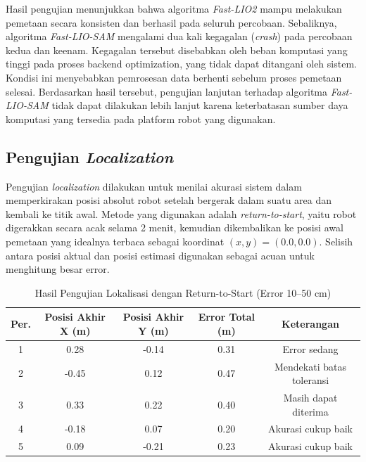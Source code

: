 Hasil pengujian menunjukkan bahwa algoritma \emph{Fast-LIO2} mampu melakukan
pemetaan secara konsisten dan berhasil pada seluruh percobaan. Sebaliknya,
algoritma \emph{Fast-LIO-SAM} mengalami dua kali kegagalan (\emph{crash}) pada
percobaan kedua dan keenam. Kegagalan tersebut disebabkan oleh beban komputasi yang
tinggi pada proses backend optimization, yang tidak dapat ditangani oleh sistem.
Kondisi ini menyebabkan pemrosesan data berhenti sebelum proses pemetaan selesai.
Berdasarkan hasil tersebut, pengujian lanjutan terhadap algoritma \emph{Fast-LIO-SAM}
tidak dapat dilakukan lebih lanjut karena keterbatasan sumber daya komputasi
yang tersedia pada platform robot yang digunakan.

\subsection{Pengujian \emph{Localization}}
Pengujian \emph{localization} dilakukan untuk menilai akurasi sistem dalam memperkirakan
posisi absolut robot setelah bergerak dalam suatu area dan kembali ke titik awal.
Metode yang digunakan adalah \emph{return-to-start}, yaitu robot digerakkan
secara acak selama 2 menit, kemudian dikembalikan ke posisi awal pemetaan yang idealnya
terbaca sebagai koordinat $(x, y) = (0.0, 0.0)$. Selisih antara posisi aktual
dan posisi estimasi digunakan sebagai acuan untuk menghitung besar error.

\begin{table}[H]
	\centering
	\caption{Hasil Pengujian Lokalisasi dengan Return-to-Start (Error 10--50 cm)}
	\label{tab:hasil_localization}
	\begin{tabular}{|c|c|c|c|c|}
		\hline
		\textbf{Per.} & \textbf{Posisi Akhir X (m)} & \textbf{Posisi Akhir Y (m)} & \textbf{Error Total (m)} & \textbf{Keterangan}       \\
		\hline
		1             & 0.28                        & -0.14                       & 0.31                     & Error sedang              \\
		2             & -0.45                       & 0.12                        & 0.47                     & Mendekati batas toleransi \\
		3             & 0.33                        & 0.22                        & 0.40                     & Masih dapat diterima      \\
		4             & -0.18                       & 0.07                        & 0.20                     & Akurasi cukup baik        \\
		5             & 0.09                        & -0.21                       & 0.23                     & Akurasi cukup baik        \\
		\hline
	\end{tabular}
\end{table}

